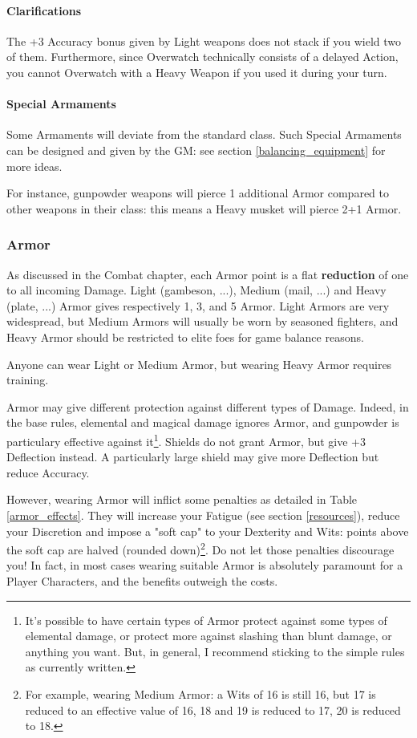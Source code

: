\paragraph{Clarifications}

The +3 Accuracy bonus given by Light weapons does not stack if you wield two of them. Furthermore, since Overwatch technically consists of a delayed Action, you cannot Overwatch with a Heavy Weapon if you used it during your turn.

\paragraph{Special Armaments} 

Some Armaments will deviate from the standard class. Such Special Armaments can be designed and given by the GM: see section \ref{balancing_equipment} for more ideas.

For instance, gunpowder weapons will pierce 1 additional Armor compared to other weapons in their class: this means a Heavy musket will pierce 2+1 Armor. 

\subsubsection{Armor}

\label{armor}

As discussed in the Combat chapter, each Armor point is a flat \textbf{reduction} of one to all incoming Damage. Light (gambeson, ...), Medium (mail, ...) and Heavy (plate, ...) Armor gives respectively 1, 3, and 5 Armor. Light Armors are very widespread, but Medium Armors will usually be worn by seasoned fighters, and Heavy Armor should be restricted to elite foes for game balance reasons. 

Anyone can wear Light or Medium Armor, but wearing Heavy Armor requires training.

Armor may give different protection against different types of Damage. Indeed, in the base rules, elemental and magical damage ignores Armor, and gunpowder is particulary effective against it\footnote{It's possible to have certain types of Armor protect against some types of elemental damage, or protect more against slashing than blunt damage, or anything you want. But, in general, I recommend sticking to the simple rules as currently written.}. Shields do not grant Armor, but give +3 Deflection instead. A particularly large shield may give more Deflection but reduce Accuracy.

However, wearing Armor will inflict some penalties as detailed in Table \ref{armor_effects}. They will increase your Fatigue (see section \ref{resources}), reduce your Discretion and impose a "soft cap" to your Dexterity and Wits: points above the soft cap are halved (rounded down)\footnote{For example, wearing Medium Armor: a Wits of 16 is still 16, but 17 is reduced to an effective value of 16, 18 and 19 is reduced to 17, 20 is reduced to 18.}. Do not let those penalties discourage you! In fact, in most cases wearing suitable Armor is absolutely paramount for a Player Characters, and the benefits outweigh the costs.


